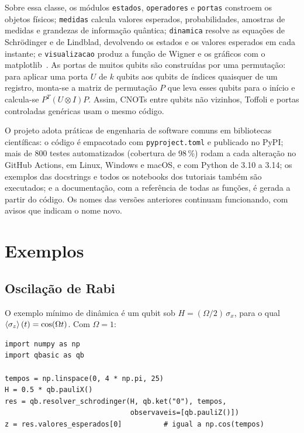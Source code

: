 \documentclass[11pt,a4paper]{article}
\newcommand{\codigo}[1]{\texttt{#1}}
\begin{document}
Sobre essa classe, os módulos \codigo{estados}, \codigo{operadores} e \codigo{portas}
constroem os objetos físicos; \codigo{medidas} calcula valores esperados, probabilidades,
amostras de medidas e grandezas de informação quântica; \codigo{dinamica} resolve as
equações de Schrödinger e de Lindblad, devolvendo os estados e os valores esperados em
cada instante; e \codigo{visualizacao} produz a função de Wigner e os gráficos com o
matplotlib~\cite{hunter2007matplotlib}. As portas de muitos qubits são construídas por uma
permutação: para aplicar uma porta $U$ de $k$ qubits aos qubits de índices quaisquer de
um registro, monta-se a matriz de permutação $P$ que leva esses qubits para o início e
calcula-se $P^T (U \otimes I) P$. Assim, CNOTs entre qubits não vizinhos, Toffoli e
portas controladas genéricas usam o mesmo código.

O projeto adota práticas de engenharia de software comuns em bibliotecas científicas: o
código é empacotado com \codigo{pyproject.toml} e publicado no PyPI; mais de 800 testes
automatizados (cobertura de 98\,\%) rodam a cada alteração no GitHub Actions, em Linux,
Windows e macOS, e com Python de 3.10 a 3.14; os exemplos das docstrings e todos os
notebooks dos tutoriais também são executados; e a documentação, com a referência de todas
as funções, é gerada a partir do código. Os nomes das versões anteriores continuam
funcionando, com avisos que indicam o nome novo.

\section{Exemplos}\label{sec:exemplos}

\subsection{Oscilação de Rabi}

O exemplo mínimo de dinâmica é um qubit sob $H = (\Omega/2)\,\sigma_x$, para o qual
$\braket{\sigma_z}(t) = \cos(\Omega t)$. Com $\Omega = 1$:

\begin{lstlisting}
import numpy as np
import qbasic as qb

tempos = np.linspace(0, 4 * np.pi, 25)
H = 0.5 * qb.pauliX()
res = qb.resolver_schrodinger(H, qb.ket("0"), tempos,
                              observaveis=[qb.pauliZ()])
z = res.valores_esperados[0]          # igual a np.cos(tempos)
\end{lstlisting}
\end{document}
